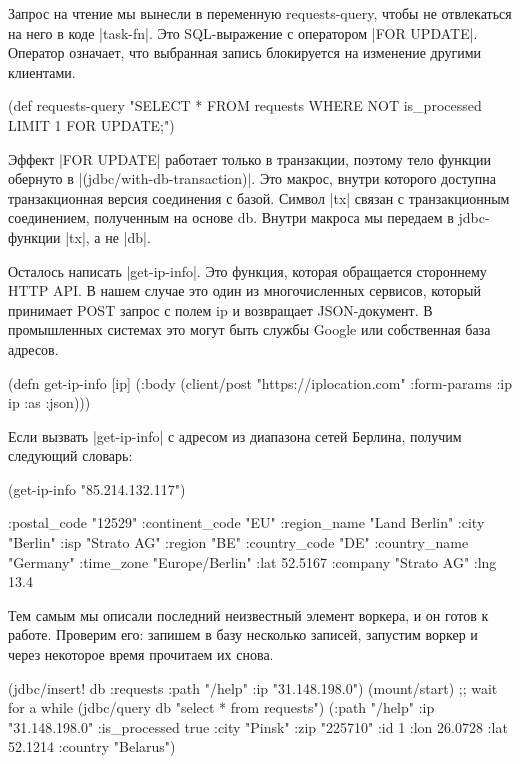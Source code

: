 Запрос на чтение мы вынесли в переменную requests-query, чтобы не отвлекаться на
него в коде \spverb|task-fn|. Это SQL-выражение с оператором \spverb|FOR UPDATE|. Оператор
означает, что выбранная запись блокируется на изменение другими клиентами.

\begin{code}
(def requests-query
  "SELECT * FROM requests
   WHERE NOT is_processed
   LIMIT 1 FOR UPDATE;")
\end{code}

Эффект \spverb|FOR UPDATE| работает только в транзакции, поэтому тело функции обернуто
в \spverb|(jdbc/with-db-transaction)|. Это макрос, внутри которого доступна
транзакционная версия соединения с базой. Символ \spverb|tx| связан с транзакционным
соединением, полученным на основе db. Внутри макроса мы передаем в jdbc-функции
\spverb|tx|, а не \spverb|db|.

Осталось написать \spverb|get-ip-info|. Это функция, которая обращается стороннему HTTP
API. В нашем случае это один из многочисленных сервисов, который принимает POST
запрос с полем ip и возвращает JSON-документ. В промышленных системах это могут
быть службы Google или собственная база адресов.

\begin{code}
(defn get-ip-info
  [ip]
  (:body
   (client/post "https://iplocation.com"
                {:form-params {:ip ip}
                 :as :json})))
\end{code}

Если вызвать \spverb|get-ip-info| с адресом из диапазона сетей Берлина, получим
следующий словарь:

\begin{code}
(get-ip-info "85.214.132.117")

{:postal_code "12529"
 :continent_code "EU"
 :region_name "Land Berlin"
 :city "Berlin"
 :isp "Strato AG"
 :region "BE"
 :country_code "DE"
 :country_name "Germany"
 :time_zone "Europe/Berlin"
 :lat 52.5167
 :company "Strato AG"
 :lng 13.4}
\end{code}

Тем самым мы описали последний неизвестный элемент воркера, и он готов к
работе. Проверим его: запишем в базу несколько записей, запустим воркер и через
некоторое время прочитаем их снова.

\begin{code}
(jdbc/insert! db :requests {:path "/help" :ip "31.148.198.0"})
(mount/start)
;; wait for a while
(jdbc/query db "select * from requests")
({:path "/help" :ip "31.148.198.0" :is_processed true
  :city "Pinsk" :zip "225710" :id 1
  :lon 26.0728 :lat 52.1214 :country "Belarus"})
\end{code}

